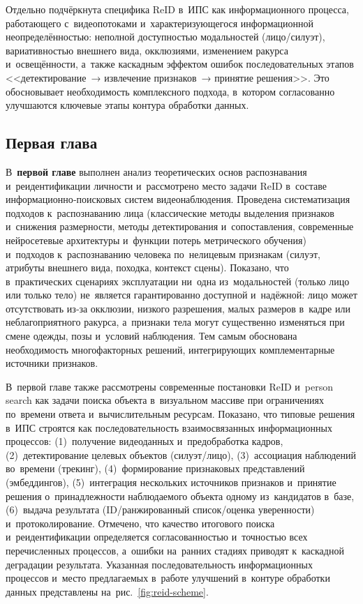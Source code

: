 Отдельно подчёркнута специфика ReID в~ИПС как информационного процесса,
работающего с~видеопотоками и~характеризующегося информационной неопределённостью:
неполной доступностью модальностей (лицо/силуэт), вариативностью внешнего вида,
окклюзиями, изменением ракурса и~освещённости, а~также каскадным эффектом ошибок
последовательных этапов <<детектирование~→ извлечение признаков~→ принятие
решения>>. Это обосновывает необходимость комплексного подхода, в~котором
согласованно улучшаются ключевые этапы контура обработки данных.

\subsection*{Первая глава}

В~\textbf{первой главе} выполнен анализ теоретических основ распознавания
и~реидентификации личности и~рассмотрено место задачи ReID в~составе
информационно‑поисковых систем видеонаблюдения. Проведена систематизация
подходов к~распознаванию лица (классические методы выделения признаков и~снижения
размерности, методы детектирования и~сопоставления, современные нейросетевые
архитектуры и~функции потерь метрического обучения) и~подходов к~распознаванию
человека по~нелицевым признакам (силуэт, атрибуты внешнего вида, походка,
контекст сцены). Показано, что в~практических сценариях эксплуатации ни~одна
из~модальностей (только лицо или только тело) не~является гарантированно доступной
и~надёжной: лицо может отсутствовать из‑за окклюзии, низкого разрешения, малых
размеров в~кадре или неблагоприятного ракурса, а~признаки тела могут существенно
изменяться при смене одежды, позы и~условий наблюдения. Тем самым обоснована
необходимость многофакторных решений, интегрирующих комплементарные источники
признаков.

В~первой главе также рассмотрены современные постановки ReID и~person search
как задачи поиска объекта в~визуальном массиве при ограничениях по~времени ответа
и~вычислительным ресурсам. Показано, что типовые решения в~ИПС строятся как
последовательность взаимосвязанных информационных процессов: (1)~получение
видеоданных и~предобработка кадров, (2)~детектирование целевых объектов
(силуэт/лицо), (3)~ассоциация наблюдений во~времени (трекинг), (4)~формирование
признаковых представлений (эмбеддингов), (5)~интеграция нескольких источников
признаков и~принятие решения о~принадлежности наблюдаемого объекта одному
из~кандидатов в~базе, (6)~выдача результата (ID/ранжированный список/оценка
уверенности) и~протоколирование. Отмечено, что качество итогового поиска
и~реидентификации определяется согласованностью и~точностью всех перечисленных
процессов, а~ошибки на~ранних стадиях приводят к~каскадной деградации результата.
Указанная последовательность информационных процессов и~место предлагаемых
в~работе улучшений в~контуре обработки данных представлены
на~рис.~\ref{fig:reid-scheme}.


